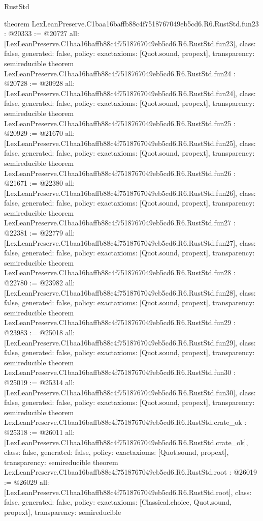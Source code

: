\begin{lexlean}{RustStd}
\begin{coremodule}
{}
theorem LexLeanPreserve.C1baa16baffb88c4f7518767049eb5cd6.R6.RustStd.fun23 : @20333 := @20727 {
  all: [LexLeanPreserve.C1baa16baffb88c4f7518767049eb5cd6.R6.RustStd.fun23],
  class: false,
  generated: false,
  policy: exact{axioms: [Quot.sound, propext]},
  transparency: semireducible
}
theorem LexLeanPreserve.C1baa16baffb88c4f7518767049eb5cd6.R6.RustStd.fun24 : @20728 := @20928 {
  all: [LexLeanPreserve.C1baa16baffb88c4f7518767049eb5cd6.R6.RustStd.fun24],
  class: false,
  generated: false,
  policy: exact{axioms: [Quot.sound, propext]},
  transparency: semireducible
}
theorem LexLeanPreserve.C1baa16baffb88c4f7518767049eb5cd6.R6.RustStd.fun25 : @20929 := @21670 {
  all: [LexLeanPreserve.C1baa16baffb88c4f7518767049eb5cd6.R6.RustStd.fun25],
  class: false,
  generated: false,
  policy: exact{axioms: [Quot.sound, propext]},
  transparency: semireducible
}
theorem LexLeanPreserve.C1baa16baffb88c4f7518767049eb5cd6.R6.RustStd.fun26 : @21671 := @22380 {
  all: [LexLeanPreserve.C1baa16baffb88c4f7518767049eb5cd6.R6.RustStd.fun26],
  class: false,
  generated: false,
  policy: exact{axioms: [Quot.sound, propext]},
  transparency: semireducible
}
theorem LexLeanPreserve.C1baa16baffb88c4f7518767049eb5cd6.R6.RustStd.fun27 : @22381 := @22779 {
  all: [LexLeanPreserve.C1baa16baffb88c4f7518767049eb5cd6.R6.RustStd.fun27],
  class: false,
  generated: false,
  policy: exact{axioms: [Quot.sound, propext]},
  transparency: semireducible
}
theorem LexLeanPreserve.C1baa16baffb88c4f7518767049eb5cd6.R6.RustStd.fun28 : @22780 := @23982 {
  all: [LexLeanPreserve.C1baa16baffb88c4f7518767049eb5cd6.R6.RustStd.fun28],
  class: false,
  generated: false,
  policy: exact{axioms: [Quot.sound, propext]},
  transparency: semireducible
}
theorem LexLeanPreserve.C1baa16baffb88c4f7518767049eb5cd6.R6.RustStd.fun29 : @23983 := @25018 {
  all: [LexLeanPreserve.C1baa16baffb88c4f7518767049eb5cd6.R6.RustStd.fun29],
  class: false,
  generated: false,
  policy: exact{axioms: [Quot.sound, propext]},
  transparency: semireducible
}
theorem LexLeanPreserve.C1baa16baffb88c4f7518767049eb5cd6.R6.RustStd.fun30 : @25019 := @25314 {
  all: [LexLeanPreserve.C1baa16baffb88c4f7518767049eb5cd6.R6.RustStd.fun30],
  class: false,
  generated: false,
  policy: exact{axioms: [Quot.sound, propext]},
  transparency: semireducible
}
theorem LexLeanPreserve.C1baa16baffb88c4f7518767049eb5cd6.R6.RustStd.crate_ok : @25318 := @26011 {
  all: [LexLeanPreserve.C1baa16baffb88c4f7518767049eb5cd6.R6.RustStd.crate_ok],
  class: false,
  generated: false,
  policy: exact{axioms: [Quot.sound, propext]},
  transparency: semireducible
}
theorem LexLeanPreserve.C1baa16baffb88c4f7518767049eb5cd6.R6.RustStd.root : @26019 := @26029 {
  all: [LexLeanPreserve.C1baa16baffb88c4f7518767049eb5cd6.R6.RustStd.root],
  class: false,
  generated: false,
  policy: exact{axioms: [Classical.choice, Quot.sound, propext]},
  transparency: semireducible
}


\end{coremodule}
\end{lexlean}
